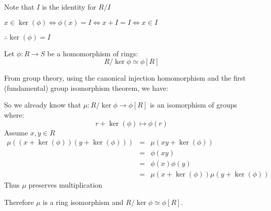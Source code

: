 \documentclass[letterpaper,12pt,fleqn]{article}
\begin{document}
\begin{theproof}
  Note that $I$ is the identity for $R/I$

  $x\in\ker(\phi)\iff\phi(x)=I\iff x+I=I\iff x\in I$

  $\therefore\ker(\phi)=I$
\end{theproof}

\begin{theorem}
  Let $\phi:R\to S$ be a homomorphism of rings:
  \[R/\ker{\phi}\simeq\phi[R]\]
\end{theorem}

\begin{theproof}
  From group theory, using the canonical injection homomorphism and the first
  (fundamental) group isomorphism theorem, we have:

  \begin{figure}[h]
    \setlength{\leftskip}{1in}
  \end{figure}

  So we already know that $\mu:R/\ker{\phi}\to\phi[R]$ is an isomorphism of groups
  where:
  \[r+\ker(\phi)\mapsto\phi(r)\]
  Assume $x,y\in R$
  \begin{eqnarray*}
    \mu((x+\ker(\phi))(y+\ker(\phi))) &=& \mu(xy+\ker(\phi)) \\
    &=& \phi(xy) \\
    &=& \phi(x)\phi(y) \\
    &=& \mu(x+\ker(\phi))\mu(y+\ker(\phi))
  \end{eqnarray*}
  Thus $\mu$ preserves multiplication

  Therefore $\mu$ is a ring isomorphism and $R/\ker{\phi}\simeq\phi[R]$.
\end{theproof}
\end{document}
